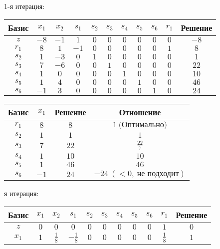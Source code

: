 \documentclass{article}%
\begin{document}
\begin{flushleft}%
1{-}я итерация: %
\newline%
\newline%
\renewcommand{\arraystretch}{1.3}%
\begin{tabular}{|c|ccccccccc|c|}%
\hline%
Базис&$x_{1}$&$x_{2}$&$s_{1}$&$s_{2}$&$s_{3}$&$s_{4}$&$s_{5}$&$s_{6}$&$r_{1}$&Решение\\%
\hline%
$z$&$-8$&$-1$&$1$&$0$&$0$&$0$&$0$&$0$&$0$&$-8$\\%
\hline%
$r_{1}$&$8$&$1$&$-1$&$0$&$0$&$0$&$0$&$0$&$1$&$8$\\%
$s_{2}$&$1$&$-3$&$0$&$1$&$0$&$0$&$0$&$0$&$0$&$1$\\%
$s_{3}$&$7$&$-6$&$0$&$0$&$1$&$0$&$0$&$0$&$0$&$22$\\%
$s_{4}$&$1$&$0$&$0$&$0$&$0$&$1$&$0$&$0$&$0$&$10$\\%
$s_{5}$&$1$&$4$&$0$&$0$&$0$&$0$&$1$&$0$&$0$&$46$\\%
$s_{6}$&$-1$&$3$&$0$&$0$&$0$&$0$&$0$&$1$&$0$&$24$\\%
\hline%
\end{tabular}%
\newline%
\newline%
\newline%
\begin{tabular}{|cccc|}%
\hline%
Базис&$x_{1}$&Решение&Отношение\\%
\hline%
$r_{1}$&$8$&$8$&$1\: \text{(Оптимально)}$\\%
$s_{2}$&$1$&$1$&$1$\\%
$s_{3}$&$7$&$22$&$\frac{22}{7}$\\%
$s_{4}$&$1$&$10$&$10$\\%
$s_{5}$&$1$&$46$&$46$\\%
$s_{6}$&$-1$&$24$&$-24\: (< 0, \: \text{не подходит})$\\%
\hline%
\end{tabular}%
\newline%
\newline%
я итерация: %
\newline%
\newline%
\renewcommand{\arraystretch}{1.3}%
\begin{tabular}{|c|ccccccccc|c|}%
\hline%
Базис&$x_{1}$&$x_{2}$&$s_{1}$&$s_{2}$&$s_{3}$&$s_{4}$&$s_{5}$&$s_{6}$&$r_{1}$&Решение\\%
\hline%
$z$&$0$&$0$&$0$&$0$&$0$&$0$&$0$&$0$&$1$&$0$\\%
\hline%
$x_{1}$&$1$&$\frac{1}{8}$&$-\frac{1}{8}$&$0$&$0$&$0$&$0$&$0$&$\frac{1}{8}$&$1$\\%

\end{tabular}
\end{flushleft}
\end{document}
